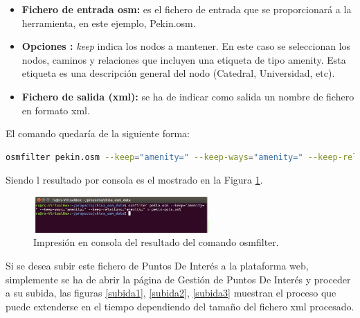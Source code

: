 \begin{itemize}
	\item \textbf{Fichero de entrada osm:} es el fichero de entrada que se proporcionará a la herramienta, en este ejemplo, Pekin.osm.
	\item \textbf{Opciones :} \textit{keep} indica los nodos a mantener. En este caso se seleccionan los nodos, caminos y relaciones que incluyen una etiqueta de tipo amenity. Esta etiqueta es una descripción general del nodo (Catedral, Universidad, etc).
	\item \textbf{Fichero de salida (xml):} se ha de indicar como salida un nombre de fichero en formato xml.
\end{itemize}

El comando quedaría de la siguiente forma:

\begin{lstlisting}[language=bash]
	osmfilter pekin.osm --keep="amenity=" --keep-ways="amenity=" --keep-relations="amenity=" > pekin-pois.xml
\end{lstlisting}

Siendo l resultado por consola es el mostrado en la Figura \ref{filter}.
\begin{figure}[h]
  \centering
    \includegraphics[width=0.6\textwidth]{../img/osmextract/filter.jpg}
  \caption{Impresión en consola del resultado del comando osmfilter.}
  \label{filter}
\end{figure}

Si se desea subir este fichero de Puntos De Interés a la plataforma web, simplemente se ha de abrir la página de Gestión de Puntos De Interés y proceder a su subida, las figuras \ref{subida1}, \ref{subida2}, \ref{subida3} muestran el proceso que puede extenderse en el tiempo dependiendo del tamaño del fichero xml procesado.

